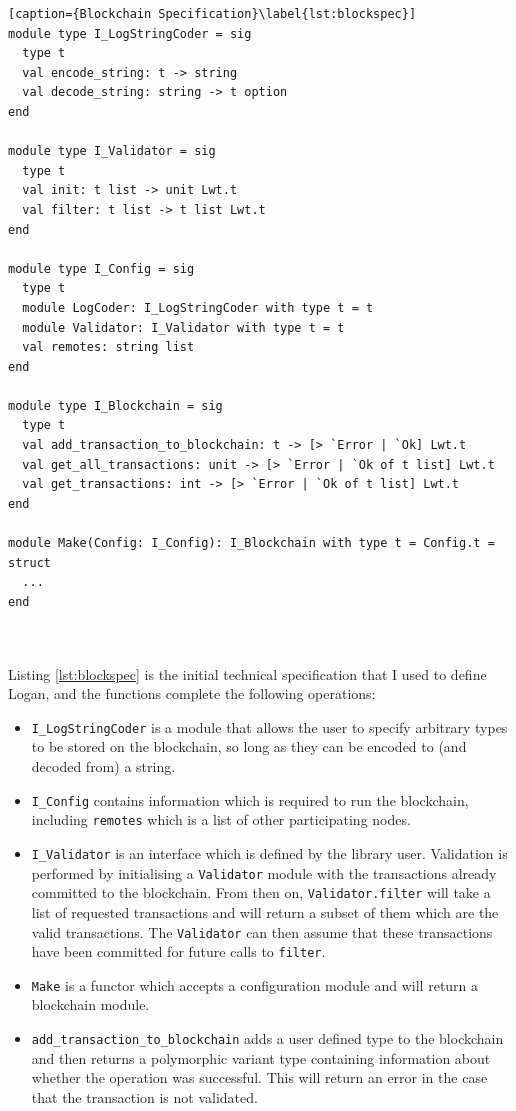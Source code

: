\documentclass[12pt,a4paper,twoside,openright]{report}
\begin{document}
	\begin{minipage}{\linewidth}
	\begin{lstlisting}[caption={Blockchain Specification}\label{lst:blockspec}]
module type I_LogStringCoder = sig
  type t
  val encode_string: t -> string
  val decode_string: string -> t option
end

module type I_Validator = sig 
  type t 
  val init: t list -> unit Lwt.t 
  val filter: t list -> t list Lwt.t
end

module type I_Config = sig
  type t
  module LogCoder: I_LogStringCoder with type t = t
  module Validator: I_Validator with type t = t
  val remotes: string list
end

module type I_Blockchain = sig
  type t
  val add_transaction_to_blockchain: t -> [> `Error | `Ok] Lwt.t
  val get_all_transactions: unit -> [> `Error | `Ok of t list] Lwt.t
  val get_transactions: int -> [> `Error | `Ok of t list] Lwt.t
end

module Make(Config: I_Config): I_Blockchain with type t = Config.t = struct 
  ...
end
	\end{lstlisting}
	\end{minipage}\\
	\\
	Listing \ref{lst:blockspec} is the initial technical specification that I used to define Logan, and the functions complete the following operations:
	\begin{itemize}
		\item \texttt{I\_LogStringCoder} is a module that allows the user to specify arbitrary types to be stored on the blockchain, so long as they can be encoded to (and decoded from) a string.
		\item \texttt{I\_Config} contains information which is required to run the blockchain, including \texttt{remotes} which is a list of other participating nodes.
		\item \texttt{I\_Validator} is an interface which is defined by the library user. 
			Validation is performed by initialising a \texttt{Validator} module with the transactions already committed to the blockchain.
			From then on, \texttt{Validator.filter} will take a list of requested transactions and will return a subset of them which are the valid transactions.
			The \texttt{Validator} can then assume that these transactions have been committed for future calls to \texttt{filter}.
		\item \texttt{Make} is a functor which accepts a configuration module and will return a blockchain module.
		\item \texttt{add\_transaction\_to\_blockchain} adds a user defined type to the blockchain and then returns a polymorphic variant type containing information about whether the operation was successful. 
			This will return an error in the case that the transaction is not validated.
	\end{itemize} 
\end{document}
